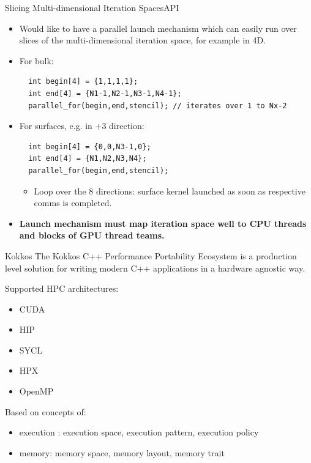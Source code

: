 \begin{frame}[fragile]{Slicing Multi-dimensional Iteration Spaces}{API}
    \begin{itemize}
      \item<1-> Would like to have a parallel launch mechanism which can easily run over slices of the multi-dimensional iteration space, for example in 4D.
      \vspace{0.6cm}
    \item<2-> For bulk:\\ 
      \begin{verbatim}
  int begin[4] = {1,1,1,1};
  int end[4] = {N1-1,N2-1,N3-1,N4-1}; 
  parallel_for(begin,end,stencil); // iterates over 1 to Nx-2
      \end{verbatim}
      \item<3-> For surfaces, e.g. in +3 direction: 
      \begin{verbatim}
  int begin[4] = {0,0,N3-1,0};
  int end[4] = {N1,N2,N3,N4};
  parallel_for(begin,end,stencil);
      \end{verbatim}
      \vspace{-0.5cm}
      \begin{itemize}
        \item Loop over the 8 directions: surface kernel launched as soon as respective comms is completed.
      \end{itemize}
      \vspace{0.6cm}
      \item<4-> \textbf{Launch mechanism must map iteration space well to CPU threads and blocks of GPU thread teams.}
    \end{itemize}
\end{frame}

\begin{frame}{Kokkos}
  The Kokkos C++ Performance Portability Ecosystem is a production
  level solution for writing modern C++ applications in a hardware agnostic way.\\
  
  \begin{bkblock}{Supported HPC architectures:}
    \begin{itemize}
      \item CUDA
      \item HIP
      \item SYCL
      \item HPX
      \item OpenMP
    \end{itemize}
  \end{bkblock}

  Based on concepts of:
  \begin{itemize}
    \item execution : execution space, execution pattern, execution policy
    \item memory: memory space, memory layout, memory trait
  \end{itemize}
\end{frame}

